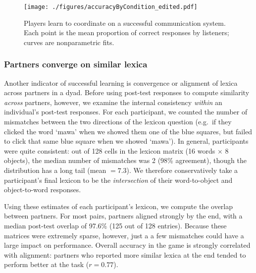 \begin{figure}[t]
\begin{center}
{\texttt{[image: ./figures/accuracyByCondition\_edited.pdf]}}
\vspace{-2ex}
{\caption{{Players learn to coordinate on a successful communication system. Each point is the mean proportion of correct responses by listeners; curves are nonparametric fits.  %
\label{fig:context_accuracy}}}}
\vspace{-3ex}
\end{center}
\end{figure}

\subsubsection{Partners converge on similar lexica}

Another indicator of successful learning is convergence or alignment of lexica across partners in a dyad. Before using post-test responses to compute similarity \emph{across} partners, however, we examine the internal consistency \emph{within} an individual's post-test responses. For each participant, we counted the number of mismatches between the two directions of the lexicon question (e.g.\ if they clicked the word `mawa' when we showed them one of the blue squares, but failed to click that same blue square when we showed `mawa'). In general, participants were quite consistent: out of 128 cells in the lexicon matrix (16 words $\times$ 8 objects), the median number of mismatches was 2 (98\% agreement), though the distribution has a long tail (mean $= 7.3$). We therefore conservatively take a participant's final lexicon to be the \emph{intersection} of their word-to-object and object-to-word responses.

Using these estimates of each participant's lexicon, we compute the overlap between partners. For most pairs, partners aligned strongly by the end, with a median post-test overlap of 97.6\% (125 out of 128 entries). Because these matrices were extremely sparse, however, just a a few mismatches could have a large impact on performance. Overall accuracy in the game is strongly correlated with alignment: partners who reported more similar lexica at the end tended to perform better at the task ($r = 0.77$).  


